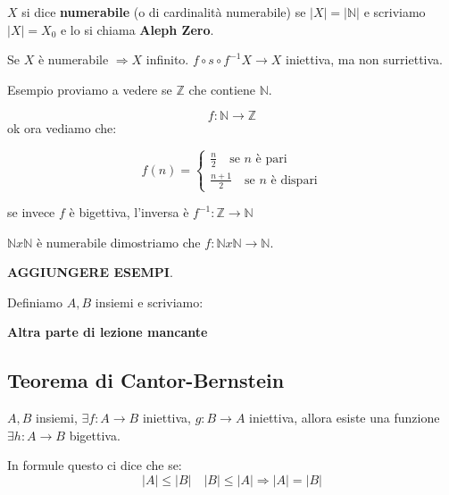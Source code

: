 \documentclass{article}
\begin{document}
$X$ si dice \textbf{numerabile} (o di cardinalità numerabile) se $|X| = |\mathbb{N}|$ e scriviamo $|X| = X_0$ e lo si chiama \textbf{Aleph Zero}. \par
Se $X$ è numerabile $\Rightarrow X$ infinito. \newline
$f \circ s \circ f^{-1} X \rightarrow X$ iniettiva, ma non surriettiva.

Esempio proviamo a vedere se $\mathbb{Z}$ che contiene $\mathbb{N}$. \par
\begin{equation}
        f : \mathbb{N} \rightarrow \mathbb{Z}
\end{equation}
ok ora vediamo che: \newline

\[
f(n) =
\begin{cases}
        \frac{n}{2} \quad \mbox{se $n$ è pari} \\
        \frac{n + 1}{2} \quad \mbox{se $n$ è dispari}
\end{cases}
\]

se invece $f$ è bigettiva, l'inversa è $f^{-1}: \mathbb{Z} \to \mathbb{N}$


$\mathbb{N} x \mathbb{N}$ è numerabile dimostriamo che $f: \mathbb{N} x \mathbb{N} \to \mathbb{N}$.

\textbf{AGGIUNGERE ESEMPI}.

Definiamo $A,B$ insiemi e scriviamo: 

\textbf{Altra parte di lezione mancante}

\subsection{Teorema di Cantor-Bernstein}
$A,B$ insiemi, $\exists f : A \to B$ iniettiva, $g: B \to A$ iniettiva, allora esiste una funzione $\exists h: A \to B$ bigettiva. \par
In formule questo ci dice che se:
\begin{equation}
        |A| \le |B| \quad |B| \le |A| \Rightarrow |A| = |B|
\end{equation} \newline
\end{document}
